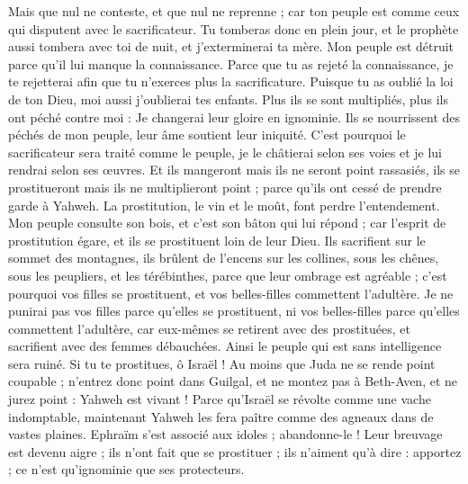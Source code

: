 \begin{multicols}{2}
Mais que nul ne conteste, et que nul ne reprenne ; car ton peuple est comme ceux qui disputent avec le sacrificateur.
Tu tomberas donc en plein jour, et le prophète aussi tombera avec toi de nuit, et j'exterminerai ta mère.
Mon peuple est détruit parce qu'il lui manque la connaissance. Parce que tu as rejeté la connaissance, je te rejetterai afin que tu n'exerces plus la sacrificature. Puisque tu as oublié la loi de ton Dieu, moi aussi j'oublierai tes enfants.
Plus ils se sont multipliés, plus ils ont péché contre moi : Je changerai leur gloire en ignominie.
Ils se nourrissent des péchés de mon peuple, leur âme soutient leur iniquité.
C'est pourquoi le sacrificateur sera traité comme le peuple, je le châtierai selon ses voies et je lui rendrai selon ses œuvres.
Et ils mangeront mais ils ne seront point rassasiés, ils se prostitueront mais ils ne multiplieront point ; parce qu'ils ont cessé de prendre garde à Yahweh.
La prostitution, le vin et le moût, font perdre l'entendement.
Mon peuple consulte son bois, et c'est son bâton qui lui répond ; car l'esprit de prostitution égare, et ils se prostituent loin de leur Dieu.
Ils sacrifient sur le sommet des montagnes, ils brûlent de l'encens sur les collines, sous les chênes, sous les peupliers, et les térébinthes, parce que leur ombrage est agréable ; c'est pourquoi vos filles se prostituent, et vos belles-filles commettent l'adultère.
Je ne punirai pas vos filles parce qu'elles se prostituent, ni vos belles-filles parce qu'elles commettent l'adultère, car eux-mêmes se retirent avec des prostituées, et sacrifient avec des femmes débauchées. Ainsi le peuple qui est sans intelligence sera ruiné.
Si tu te prostitues, ô Israël ! Au moins que Juda ne se rende point coupable ; n'entrez donc point dans Guilgal, et ne montez pas à Beth-Aven, et ne jurez point : Yahweh est vivant !
Parce qu'Israël se révolte comme une vache indomptable, maintenant Yahweh les fera paître comme des agneaux dans de vastes plaines.
Ephraïm s'est associé aux idoles ; abandonne-le !
Leur breuvage est devenu aigre ; ils n'ont fait que se prostituer ; ils n'aiment qu'à dire : apportez ; ce n'est qu'ignominie que ses protecteurs.

\end{multicols}
